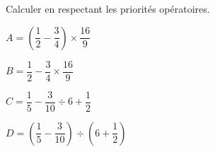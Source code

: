\begin{exercice*}
    Calculer en respectant les priorités opératoires.
        \begin{multicols}{2}
            \begin{spacing}{1.5}
                \begin{list}{}{}
                    \item $A=\left(\dfrac{1}{2}-\dfrac{3}{4}\right)\times\dfrac{16}{9}$
                    \item $B=\dfrac{1}{2}-\dfrac{3}{4}\times\dfrac{16}{9}$
                    \item $C=\dfrac{1}{5}-\dfrac{3}{10}\div 6+\dfrac{1}{2}$
                    \item $D=\left(\dfrac{1}{5}-\dfrac{3}{10}\right)\div\left(6+\dfrac{1}{2}\right)$
                \end{list}
            \end{spacing}
        \end{multicols}
\end{exercice*}

